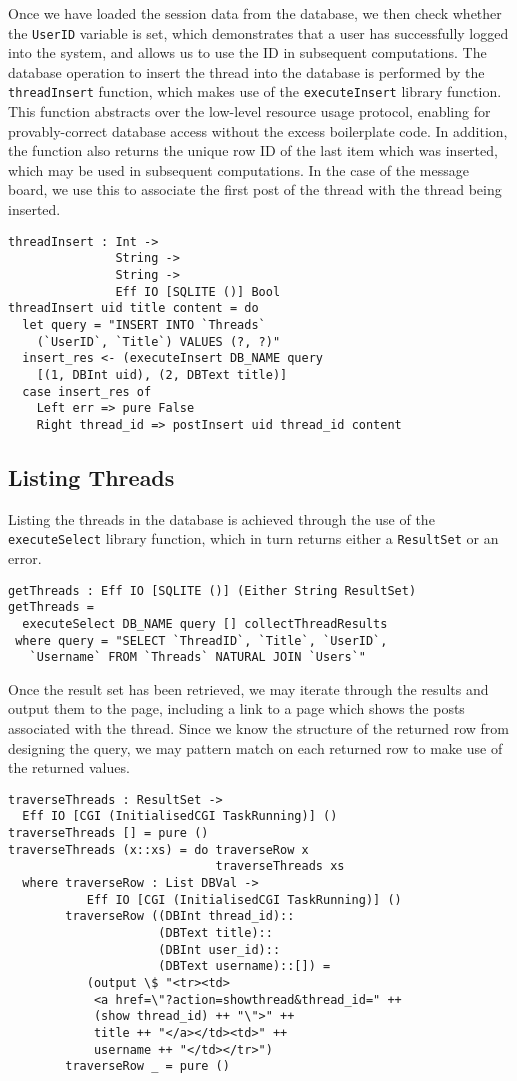 \documentclass[preprint]{sigplanconf}
\begin{document}
Once we have loaded the session data from the database, we then check whether the \texttt{UserID} variable is set, which demonstrates that a user has successfully logged into the system, and allows us to use the ID in subsequent computations. The database operation to insert the thread into the database is performed by the \texttt{threadInsert} function, which makes use of the \texttt{executeInsert} library function. This function abstracts over the low-level resource usage protocol, enabling for provably-correct database access without the excess boilerplate code. In addition, the function also returns the unique row ID of the last item which was inserted, which may be used in subsequent computations. In the case of the message board, we use this to associate the first post of the thread with the thread being inserted.
\begin{Verbatim}
threadInsert : Int -> 
               String -> 
               String -> 
               Eff IO [SQLITE ()] Bool
threadInsert uid title content = do
  let query = "INSERT INTO `Threads` 
    (`UserID`, `Title`) VALUES (?, ?)"
  insert_res <- (executeInsert DB_NAME query 
    [(1, DBInt uid), (2, DBText title)]
  case insert_res of
    Left err => pure False
    Right thread_id => postInsert uid thread_id content
\end{Verbatim}
\subsection{Listing Threads}
Listing the threads in the database is achieved through the use of the \texttt{executeSelect} library function, which in turn returns either a \texttt{ResultSet} or an error. 
\begin{Verbatim}
getThreads : Eff IO [SQLITE ()] (Either String ResultSet)
getThreads = 
  executeSelect DB_NAME query [] collectThreadResults
 where query = "SELECT `ThreadID`, `Title`, `UserID`, 
   `Username` FROM `Threads` NATURAL JOIN `Users`"
\end{Verbatim}
Once the result set has been retrieved, we may iterate through the results and output them to the page, including a link to a page which shows the posts associated with the thread. Since we know the structure of the returned row from designing the query, we may pattern match on each returned row to make use of the returned values.
\begin{Verbatim}
traverseThreads : ResultSet -> 
  Eff IO [CGI (InitialisedCGI TaskRunning)] ()
traverseThreads [] = pure ()
traverseThreads (x::xs) = do traverseRow x
                             traverseThreads xs
  where traverseRow : List DBVal -> 
           Eff IO [CGI (InitialisedCGI TaskRunning)] ()
        traverseRow ((DBInt thread_id)::
                     (DBText title)::
                     (DBInt user_id)::
                     (DBText username)::[]) =
           (output \$ "<tr><td>
            <a href=\"?action=showthread&thread_id=" ++ 
            (show thread_id) ++ "\">" ++ 
            title ++ "</a></td><td>" ++ 
            username ++ "</td></tr>") 
        traverseRow _ = pure ()
\end{Verbatim}
\end{document}
